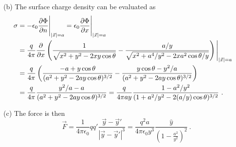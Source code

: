 \documentclass[12pt]{article}
\begin{document}
\newpage
\noindent(b) The surface charge density can be evaluated as
\begin{align}
    \sigma &= - \epsilon_0 \frac{\partial \Phi}{\partial n} \Bigg|_{|\vec x| = a}  = \epsilon_0 \frac{\partial \Phi}{\partial x} \Bigg|_{|\vec x| = a}\cr
    &= \frac{q}{4\pi} \frac{\partial}{\partial x} \left( \frac{1}{\sqrt{x^2 + y^2 - 2xy\cos \theta}} - \frac{a/y}{\sqrt{x^2 + a^4/y^2 - 2 x a^2 \cos \theta/y} } \right)\Bigg|_{|\vec x| = a}\cr
    &= \frac{q}{4\pi}\left( \frac{-a + y \cos\theta}{(a^2 + y^2 - 2ay\cos \theta)^{3/2}} - \frac{y\cos \theta -y^2/a}{(a^2 + y^2 - 2ay\cos \theta)^{3/2}} \right) \cr
    &= \frac{q}{4\pi} \frac{y^2/a-a}{(a^2 + y^2 - 2ay\cos \theta)^{3/2}} = \frac{q}{4\pi ay} \frac{1-a^2/y^2}{(1+ a^2/y^2 - 2(a/y)\cos \theta)^{3/2}}~.
\end{align}


\newpage
\noindent(c) The force is then
\begin{equation}
    \vec F = \frac{1}{4\pi \epsilon_0} q q' \frac{\vec y - \vec y'}{|\vec y - \vec y'|^3} = \frac{q^2 a}{4\pi \epsilon_0 y^3} \frac{\hat y}{\left(1- \frac{a^2}{y^2}\right)^2}~.
\end{equation}
\end{document}
